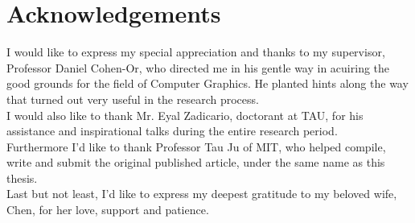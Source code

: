 \section*{Acknowledgements}
\label{sec:ack}

I would like to express my special appreciation and thanks to my supervisor, Professor Daniel Cohen-Or, who directed me in his gentle way in acuiring the good grounds for the field of Computer Graphics. He planted hints along the way that turned out very useful in the research process.
\\
I would also like to thank Mr. Eyal Zadicario, doctorant at TAU, for his assistance and inspirational talks during the entire research period.
\\
Furthermore I'd like to thank Professor Tau Ju of MIT, who helped compile, write and submit the original published article, under the same name as this thesis.
\\
Last but not least, I'd like to express my deepest gratitude to my beloved wife, Chen, for her love, support and patience.
